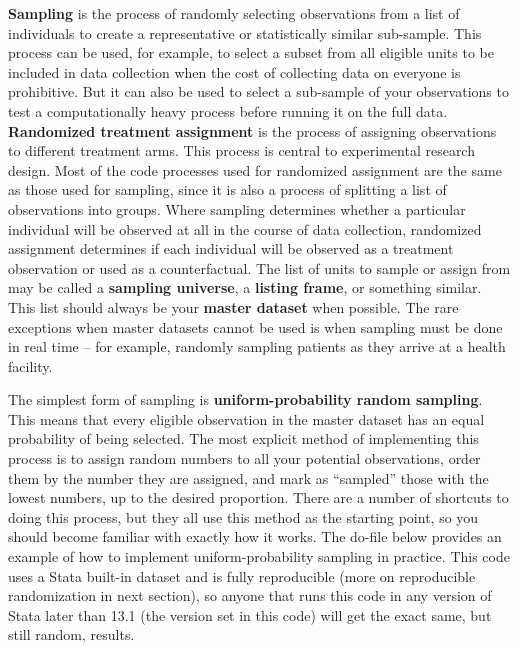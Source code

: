 \textbf{Sampling} is the process of randomly selecting observations
from a list of individuals to create a representative or statistically similar sub-sample.
This process can be used, for example, to select a subset from all eligible units
to be included in data collection when the cost of collecting data on everyone is prohibitive.
But it can also be used to select a sub-sample of your observations to test a computationally heavy process 
before running it on the full data.
\textbf{Randomized treatment assignment} is the process of assigning observations to different treatment arms.
This process is central to experimental research design.
Most of the code processes used for randomized assignment are the same as those used for sampling,
since it is also a process of splitting a list of observations into groups.
Where sampling determines whether a particular individual
will be observed at all in the course of data collection,
randomized assignment determines if each individual will be observed
as a treatment observation or used as a counterfactual.
The list of units to sample or assign from may be called a \textbf{sampling universe},
a \textbf{listing frame}, or something similar.
This list should always be your \textbf{master dataset} when possible.
The rare exceptions when master datasets cannot be used is when sampling must be done in real time --
for example, randomly sampling patients as they arrive at a health facility.

The simplest form of sampling is 
\textbf{uniform-probability random sampling}.
This means that every eligible observation in the master dataset
has an equal probability of being selected.
The most explicit method of implementing this process
is to assign random numbers to all your potential observations,
order them by the number they are assigned,
and mark as ``sampled'' those with the lowest numbers, up to the desired proportion.
There are a number of shortcuts to doing this process,
but they all use this method as the starting point,
so you should become familiar with exactly how it works.
The do-file below provides an example of
how to implement uniform-probability sampling in practice.
This code uses a Stata built-in dataset and is fully reproducible
(more on reproducible randomization in next section),
so anyone that runs this code in any version of Stata later than 13.1
(the version set in this code)
will get the exact same, but still random, results.

